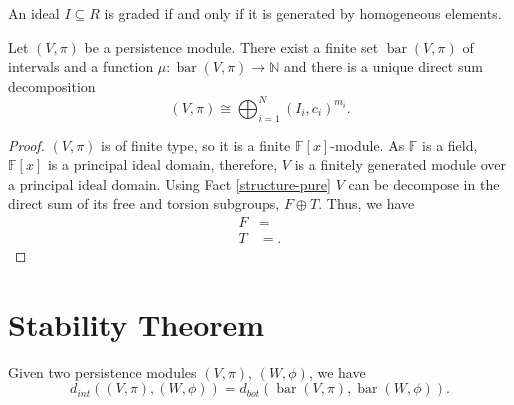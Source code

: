 \begin{proposition}
    An ideal $ I \subseteq R $ is graded if and only if it is generated by homogeneous elements.
\end{proposition}

\begin{theorem}[Structure]
    Let $ (V, \pi) $ be a persistence module. There exist a finite set $ \operatorname{bar}(V, \pi) $ of intervals and a function $ \mu : \operatorname{bar}(V, \pi) \longrightarrow \mathbb N $ and there is a unique direct sum decomposition
    $$
        (V, \pi) \cong \bigoplus_{i=1}^N (I_i, c_i)^{m_i}.
    $$
\end{theorem}
\begin{proof}
    $ (V, \pi) $ is of finite type, so it is a finite $ \mathbb F[x] $-module. As $ \mathbb F $ is a field, $ \mathbb F[x] $ is a principal ideal domain, therefore, $ V $ is a finitely generated module over a principal ideal domain. Using Fact \ref{structure-pure} $ V $ can be decompose in the direct sum of its free and torsion subgroups, $ F \oplus T $. Thus, we have
    \begin{align*}
        F &= \\
        T &= .
    \end{align*}
    
\end{proof}

\newpage
\section{Stability Theorem}
\begin{lemma}
    
\end{lemma}

\begin{theorem}[Stability]
    Given two persistence modules $ (V, \pi) $, $ (W, \phi) $, we have
    $$
        d_{int} ((V, \pi), (W, \phi)) = d_{bot} (\operatorname{bar}(V, \pi), \operatorname{bar}(W, \phi)).
    $$
\end{theorem}
